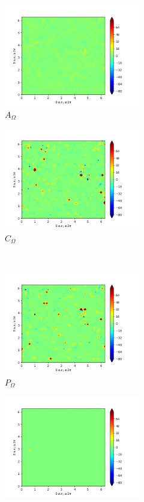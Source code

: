 \begin{figure}[H]
\begin{subfigure}{0.45\textwidth}
        \includegraphics[height=1.75in]{media/run-cds-65/A-enst-1380.png}
        \caption{$A_{\Omega}$}
    \end{subfigure}
    \newline
    \begin{subfigure}{0.45\textwidth}
        \includegraphics[height=1.75in]{media/run-cds-65/Pi-enst-1380.png}
        \caption{$C_{\Omega}$}
    \end{subfigure}
    ~
    \begin{subfigure}{0.45\textwidth}
        \includegraphics[height=1.75in]{media/run-cds-65/P-enst-1380.png}
        \caption{$P_{\Omega}$}
    \end{subfigure}
    \newline
    \begin{subfigure}{0.45\textwidth}
        \includegraphics[height=1.75in]{media/run-cds-65/B-enst-1380.png}

\end{subfigure}
\end{figure}
